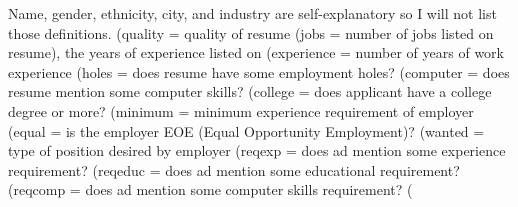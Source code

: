 



Name, gender, ethnicity, city, and industry are self-explanatory so I will not list those definitions.
(quality = quality of resume 
(jobs = number of jobs listed on resume), the years of experience listed on 
(experience = number of years of work experience
(holes = does resume have some employment holes?
(computer = does resume mention some computer skills?
(college = does applicant have a college degree or more?
(minimum = minimum experience requirement of employer
(equal = is the employer EOE (Equal Opportunity Employment)?
(wanted = type of position desired by employer
(reqexp = does ad mention some experience requirement?
(reqeduc = does ad mention some educational requirement?
(reqcomp = does ad mention some computer skills requirement?
( 

